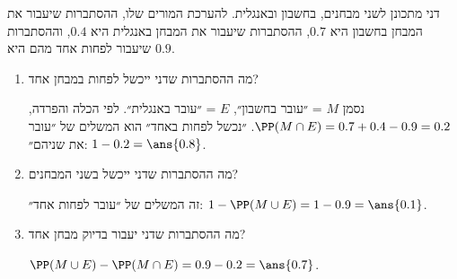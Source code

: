 דני מתכונן לשני מבחנים, בחשבון ובאנגלית. להערכת המורים שלו, ההסתברות שיעבור את המבחן בחשבון היא $0.7$, ההסתברות שיעבור את המבחן באנגלית היא $0.4$, וההסתברות שיעבור לפחות אחד מהם היא $0.9$.
\begin{enumerate}
\item מה ההסתברות שדני ייכשל לפחות במבחן אחד?
\begin{solbox}
נסמן $M$ = ״עובר בחשבון״, $E$ = ״עובר באנגלית״. לפי הכלה והפרדה, $\PP(M\cap E)=0.7+0.4-0.9=0.2$. ״נכשל לפחות באחד״ הוא המשלים של ״עובר את שניהם״: $1-0.2=\ans{0.8}$.
\end{solbox}
\item מה ההסתברות שדני ייכשל בשני המבחנים?
\begin{solbox}
זה המשלים של ״עובר לפחות אחד״: $1-\PP(M\cup E)=1-0.9=\ans{0.1}$.
\end{solbox}
\item מה ההסתברות שדני יעבור בדיוק מבחן אחד?
\begin{solbox}
$\PP(M\cup E)-\PP(M\cap E)=0.9-0.2=\ans{0.7}$.
\end{solbox}
\end{enumerate}
